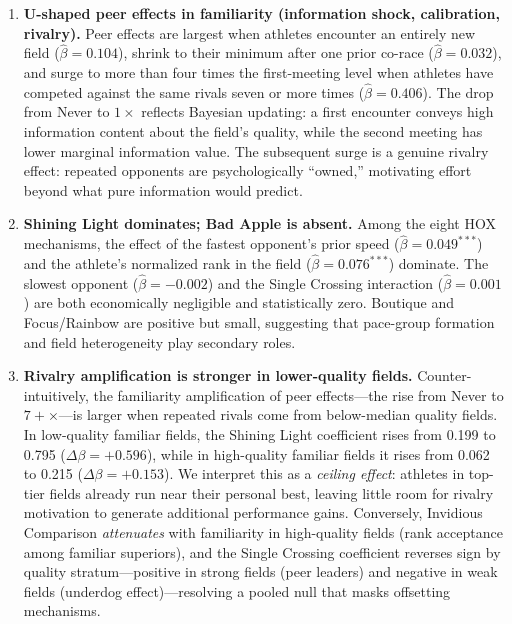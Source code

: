 \documentclass[12pt]{article}
\theoremstyle{definition}
\theoremstyle{remark}
\begin{document}
\begin{enumerate}[leftmargin=0.5in, label=\textit{Result \arabic*.}]

\item \textbf{U-shaped peer effects in familiarity (information shock, calibration, rivalry).}
Peer effects are largest when athletes encounter an entirely new field
($\hat\beta = 0.104$), shrink to their minimum after one prior co-race
($\hat\beta = 0.032$), and surge to more than four times the first-meeting
level when athletes have competed against the same rivals seven or more
times ($\hat\beta = 0.406$).
The drop from Never to $1\times$ reflects Bayesian updating: a first
encounter conveys high information content about the field's quality, while
the second meeting has lower marginal information value.
The subsequent surge is a genuine rivalry effect: repeated opponents are
psychologically ``owned,'' motivating effort beyond what pure information
would predict.

\item \textbf{Shining Light dominates; Bad Apple is absent.}
Among the eight HOX mechanisms, the effect of the fastest opponent's prior
speed ($\hat\beta = 0.049^{***}$) and the athlete's normalized rank in the
field ($\hat\beta = 0.076^{***}$) dominate.
The slowest opponent ($\hat\beta = -0.002$) and the Single Crossing interaction
($\hat\beta = 0.001$) are both economically negligible and statistically zero.
Boutique and Focus/Rainbow are positive but small, suggesting that pace-group
formation and field heterogeneity play secondary roles.

\item \textbf{Rivalry amplification is stronger in lower-quality fields.}
Counter-intuitively, the familiarity amplification of peer effects---the rise from
Never to $7+\times$---is larger when repeated rivals come from below-median quality fields.
In low-quality familiar fields, the Shining Light coefficient rises from 0.199 to
0.795 ($\Delta\beta = +0.596$), while in high-quality familiar fields it rises from
0.062 to 0.215 ($\Delta\beta = +0.153$).
We interpret this as a \textit{ceiling effect}: athletes in top-tier fields already
run near their personal best, leaving little room for rivalry motivation to generate
additional performance gains.
Conversely, Invidious Comparison \textit{attenuates} with familiarity in high-quality
fields (rank acceptance among familiar superiors), and the Single Crossing coefficient
reverses sign by quality stratum---positive in strong fields (peer leaders) and
negative in weak fields (underdog effect)---resolving a pooled null that
masks offsetting mechanisms.


\end{enumerate}
\end{document}
